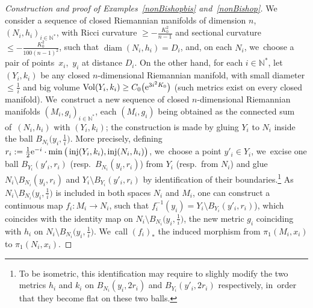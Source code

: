 \documentclass[pdftex]{sigma}
\numberwithin{equation}{section}
\newcommand{\N}{\mathbb{N}}
\newcommand{\f}{\rightarrow}
\newcommand{\Vol}{\operatorname{Vol}}
\newcommand{\diam}{\operatorname{diam}}
\newcommand{\inj}{\operatorname{inj}}
\begin{document}
\begin{proof}[Construction and proof of Examples~\ref{nonBishopbis} and~\ref{nonBishop}]
We consider a sequence of closed Riemannian manifolds of dimension $n$, $(N_i, h_i)_{i \in \N^*}$, with Ricci curvature $\ge - \frac{K_0^2}{n-1}$
and sectional curvature $\le - \frac{K_0^2}{100 (n-1)^2}$, such that $\diam (N_i, h_i) = D_i $, and, on each $N_i$, we~choose a pair of points~$x_i$,~$y_i$ at distance $D_i$. On the other hand, for each $i \in \N^*$, let $(Y_i, k_i)$ be any closed $n$-dimensional Riemannian manifold, with small diameter $\le \frac{1}{i}$ and big volume $\Vol (Y_i, k_i) \ge C_0 \big( {\rm e}^{3 i^2 K_0}\big)$ (such metrics exist on every closed
manifold). We~construct a new sequence of closed $n$-dimensional Riemannian manifolds
$(M_i, g_i)_{i \in \N^*}$, each $(M_i, g_i)$ being obtained as the connected sum of~$(N_i, h_i)$ with $(Y_i, k_i)$; the construction is made by gluing $Y_i$ to
$N_i$ inside
the ball $B_{N_i} \big(y_i, \frac{1}{i} \big)$. More precisely, defining
$r_i := \frac{1}{2} {\rm e}^{-i}\cdot \min \big( \inj (Y_i, k_i), \inj (N_i, h_i)\big)$, we~choose
a point $y'_i \in Y_i$, we~excise one ball $B_{Y_i} (y'_i, r_i)$ (resp.\ $B_{N_i} (y_i, r_i)$) from $Y_i$ (resp.\ from $N_i$) and glue
$N_i \setminus B_{N_i} (y_i, r_i)$ and $Y_i \setminus B_{Y_i} (y'_i, r_i)$ by identification of their boundaries.\footnote{To be isometric, this identification may
require to slighly modify the two metrics $h_i$ and $k_i$ on $ B_{N_i} (y_i, 2 r_i)$ and $ B_{Y_i} (y'_i, 2 r_i)$ respectively, in~order that they become flat
on these two balls.} As~$N_i \setminus B_{N_i} \big(y_i, \frac{1}{i}\big)$ is included in both spaces
$N_i $ and $M_i$,
one can construct a continuous map $f_i\colon M_i \f N_i$, such that $f_i^{-1} (y_i) = Y_i \setminus B_{Y_i} (y'_i, r_i) $), which coincides with
the identity map on $N_i \setminus B_{N_i} \big(y_i, \frac{1}{i}\big)$, the new metric $g_i$ coinciding with
$h_i$ on $N_i \setminus B_{N_i} \big(y_i, \frac{1}{i}\big)$. We~call $(f_i)_* $ the induced morphism from $\pi_1 (M_i, x_i)$ to $\pi_1 (N_i, x_i)$.


\end{proof}
\end{document}
